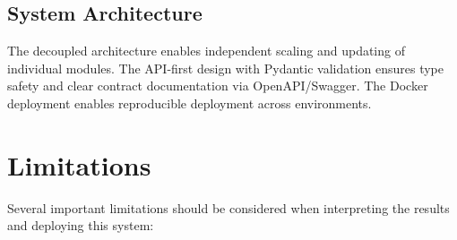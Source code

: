 \documentclass[conference]{IEEEtran}
\begin{document}
\subsection{System Architecture}
The decoupled architecture enables independent scaling and updating of individual modules. The API-first design with Pydantic validation ensures type safety and clear contract documentation via OpenAPI/Swagger. The Docker deployment enables reproducible deployment across environments.


\section{Limitations}
\label{sec:limitations}

Several important limitations should be considered when interpreting the results and deploying this system:
\end{document}
